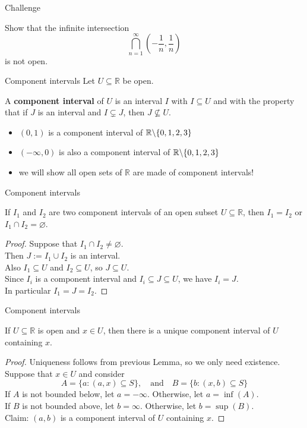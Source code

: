 \documentclass{beamer}
\begin{document}
\begin{frame}{Challenge}
\begin{prob}
Show that the infinite intersection
$$\bigcap_{n=1}^\infty (-\frac{1}{n},\frac{1}{n})$$
is not open.
\end{prob}
\end{frame}

\begin{frame}{Component intervals}
Let $U\subseteq \mathbb{R}$ be open.
\pause
\begin{defn}
A \textbf{component interval} of $U$ is an interval $I$ with $I\subseteq U$ and with the property that if $J$ is an interval and $I\subsetneq J$, then $J\nsubseteq U$.
\end{defn}
\begin{itemize}
\pause
\item $(0,1)$ is a component interval of $\mathbb{R}\backslash \{0,1,2,3\}$
\pause
\item $(-\infty,0)$ is also a component interval of $\mathbb{R}\backslash \{0,1,2,3\}$
\pause
\item we will show all open sets of $\mathbb{R}$ are made of component intervals!
\end{itemize}
\end{frame}

\begin{frame}{Component intervals}
\begin{lemma}
If $I_1$ and $I_2$ are two component intervals of an open subset $U\subseteq\mathbb{R}$, then $I_1=I_2$ or $I_1\cap I_2 = \varnothing$.
\end{lemma}
\pause
\begin{proof}
\pause
Suppose that $I_1\cap I_2 \neq \varnothing$.\\
\pause
Then $J := I_1\cup I_2$ is an interval.\\
\pause
Also $I_1\subseteq U$ and $I_2\subseteq U$, so $J\subseteq U$.\\
\pause
Since $I_i$ is a component interval and $I_i\subseteq J\subseteq U$, we have $I_i = J$.\\
\pause
In particular $I_1 = J = I_2$.
\end{proof}
\end{frame}

\begin{frame}{Component intervals}
\begin{thm}[Apostol 3.10]
If $U\subseteq\mathbb{R}$ is open and $x\in U$, then there is a unique component interval of $U$ containing $x$.
\end{thm}
\pause
\begin{proof}
Uniqueness follows from previous Lemma, so we only need existence.\\
\pause
Suppose that $x\in U$ and consider
$$A = \{a: (a,x)\subseteq S\},\quad\text{and}\quad B = \{b: (x,b)\subseteq S\}$$
\pause
If $A$ is not bounded below, let $a=-\infty$.  Otherwise, let $a = \inf (A)$.\\
\pause
If $B$ is not bounded above, let $b=\infty$.  Otherwise, let $b = \sup (B)$.\\
\pause
Claim: $(a,b)$ is a component interval of $U$ containing $x$.
\end{proof}
\end{frame}
\end{document}
